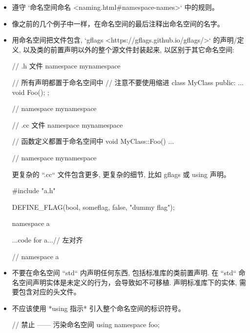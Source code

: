 \begin{itemize}
  \item 遵守 `命名空间命名 <naming.html#namespace-names>` 中的规则。
  \item 像之前的几个例子中一样，在命名空间的最后注释出命名空间的名字。
  \item 用命名空间把文件包含, `gflags <https://gflags.github.io/gflags/>` 的声明/定义, 以及类的前置声明以外的整个源文件封装起来, 以区别于其它命名空间:

\begin{cppcode}
  // .h 文件
  namespace mynamespace {

      // 所有声明都置于命名空间中
      // 注意不要使用缩进
  class MyClass {
  public:
  ...
  void Foo();
  };
} // namespace mynamespace
\end{cppcode}

\begin{cppcode}
// .cc 文件
namespace mynamespace {

  // 函数定义都置于命名空间中
  void MyClass::Foo() {
  ...
  }

} // namespace mynamespace
\end{cppcode}

        更复杂的 ``.cc`` 文件包含更多, 更复杂的细节, 比如 gflags 或 using 声明。

\begin{cppcode}
  #include "a.h"

  DEFINE_FLAG(bool, someflag, false, "dummy flag");

  namespace a {

      ...code for a...// 左对齐

    } // namespace a
\end{cppcode}

  \item 不要在命名空间 ``std`` 内声明任何东西, 包括标准库的类前置声明. 在 ``std`` 命名空间声明实体是未定义的行为，会导致如不可移植. 声明标准库下的实体, 需要包含对应的头文件。

  \item 不应该使用 *using 指示* 引入整个命名空间的标识符号。

\begin{cppcode}
  // 禁止 —— 污染命名空间
  using namespace foo;
\end{cppcode}


\end{itemize}
